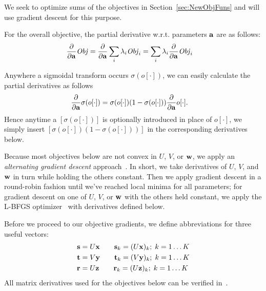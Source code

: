 
We seek to optimize sums of the objectives in Section~\ref{sec:NewObjFuns}
and will use gradient descent for this purpose.

For the overall objective, the partial derivative 
w.r.t. parameters $\mathbf{a}$ are as follows:
\begin{align}
\frac{\partial}{\partial \mathbf{a}} \mathit{Obj} & = \frac{\partial}{\partial \mathbf{a}} \sum_i \lambda_i \mathit{Obj}_i = \sum_i \lambda_i \frac{\partial}{\partial \mathbf{a}} \mathit{Obj}_i \label{eq:sum_der}
\end{align}

Anywhere a sigmoidal transform occurs $\sigma(o[\cdot])$, we
can easily calculate the partial derivatives as follows
\begin{align}
 \frac{\partial}{\partial \mathbf{a}}\sigma(o[\cdot]) & = \sigma(o[\cdot]) (1 - \sigma(o[\cdot])) \frac{\partial}{\partial \mathbf{a}} o[\cdot] .
\end{align}
Hence anytime a $[\sigma(o[\cdot])]$ is optionally introduced in place
of $o[\cdot]$, we simply insert $[\sigma(o[\cdot]) (1 -
\sigma(o[\cdot]))]$ in the corresponding derivatives
below.

Because most objectives below are not convex in $U$, $V$,
or $\mathbf{w}$, we apply an \emph{alternating gradient descent} approach~\cite{pmf}.
In short, we take derivatives of $U$, $V$, and $\mathbf{w}$ in turn while holding
the others constant.  Then we apply gradient descent in a round-robin
fashion until we've reached local minima for all parameters; for gradient
descent on one of $U$, $V$, or $\mathbf{w}$ with the others held constant, we
apply the L-BFGS optimizer~\cite{lbfgs} with derivatives defined below.

Before we proceed to our objective gradients, we define abbreviations
for three useful vectors:
\begin{align*}
\mathbf{s} & = U \mathbf{x} \qquad \mathbf{s}_{k} = (U \mathbf{x})_{k}; \; k=1\ldots K\\
\mathbf{t} & = V \mathbf{y} \qquad \mathbf{t}_{k} = (V \mathbf{y})_{k}; \; k=1\ldots K\\
\mathbf{r} & = U \mathbf{z} \qquad \mathbf{r}_{k} = (U \mathbf{z})_{k}; \; k=1\ldots K
\end{align*}
All matrix derivatives used for the objectives below can be
verified in~\cite{matrix}.


